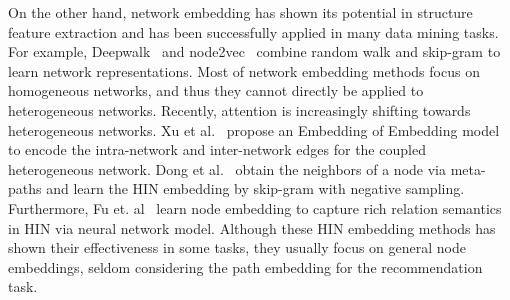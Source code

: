 On the other hand, network embedding has shown its potential in structure feature extraction and has been successfully applied in many data mining tasks. For example, Deepwalk~\cite{perozzi2014deepwalk} and node2vec~\cite{grover2016node2vec} combine random walk and skip-gram to learn network representations. Most of network embedding methods focus on homogeneous networks, and thus they cannot directly be applied to heterogeneous networks. Recently, attention is increasingly shifting towards heterogeneous networks.  Xu et al.~\cite{xu2017embedding} propose an Embedding of Embedding model to encode the intra-network and inter-network edges for the coupled heterogeneous network. Dong et al.~\cite{dong2017metapath2vec} obtain the neighbors of a node via meta-paths and learn the HIN embedding by skip-gram with negative sampling. Furthermore, Fu et. al~\cite{Fu2017HIN2Vec} learn node embedding to capture rich relation semantics in HIN via neural network model. Although these HIN embedding methods has shown their effectiveness in some tasks, they usually focus on general node embeddings, seldom considering the path embedding for the recommendation task.


